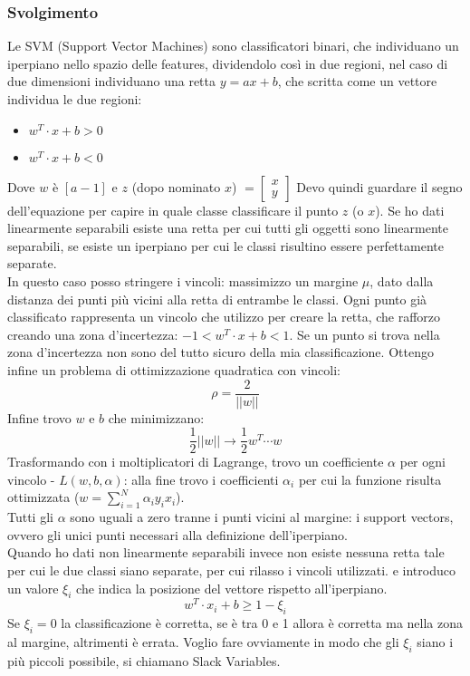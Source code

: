 \documentclass{article}
\begin{document}
\subsubsection*{Svolgimento}
Le SVM (Support Vector Machines) sono classificatori binari, che individuano un iperpiano nello spazio delle features, dividendolo così in due regioni, nel caso di due dimensioni individuano una retta $y = ax + b$, che scritta come un vettore individua le due regioni:
\begin{itemize}
    \item $w^T \cdot x + b > 0$
    \item $w^T \cdot x + b < 0$ 
\end{itemize}
Dove $w$ è $[a -1]$ e $z$ (dopo nominato $x$) $ = \begin{bmatrix} x \\ y \end{bmatrix}$
Devo quindi guardare il segno dell'equazione per capire in quale classe classificare il punto $z$ (o $x$). Se ho dati linearmente separabili esiste una retta per cui tutti gli oggetti sono linearmente separabili, se esiste un iperpiano per cui le classi risultino essere perfettamente separate.\\ In questo caso posso stringere i vincoli: massimizzo un margine $\mu$, dato dalla distanza dei punti più vicini alla retta di entrambe le classi. Ogni punto già classificato rappresenta un vincolo che utilizzo per creare la retta, che rafforzo creando una zona d'incertezza: $-1 < w^T \cdot x + b < 1$. Se un punto si trova nella zona d'incertezza non sono del tutto sicuro della mia classificazione. Ottengo infine un problema di ottimizzazione quadratica con vincoli:
$$ \rho = \frac{2}{||w||} $$
Infine trovo $w$ e $b$ che minimizzano: $$ \frac{1}{2} ||w|| \rightarrow \frac{1}{2} w^T \cdots w $$
Trasformando con i moltiplicatori di Lagrange, trovo un coefficiente $\alpha$ per ogni vincolo - $L(w,b,\alpha)$: alla fine trovo i coefficienti $\alpha_i$ per cui la funzione risulta ottimizzata ($w = \sum^N_{i=1} \alpha_iy_ix_i$).\\
Tutti gli $\alpha$ sono uguali a zero tranne i punti vicini al margine: i support vectors, ovvero gli unici punti necessari alla definizione dell'iperpiano.\\
Quando ho dati non linearmente separabili invece non esiste nessuna retta tale per cui le due classi siano separate, per cui rilasso i vincoli utilizzati. e introduco un valore $\xi_i$ che indica la posizione del vettore rispetto all'iperpiano. $$w^T \cdot x_i + b \geq 1 - \xi_i$$
Se $\xi_i = 0$ la classificazione è corretta, se è tra 0 e 1 allora è corretta ma nella zona al margine, altrimenti è errata. Voglio fare ovviamente in modo che gli $\xi_i$ siano i più piccoli possibile, si chiamano Slack Variables.
\end{document}
